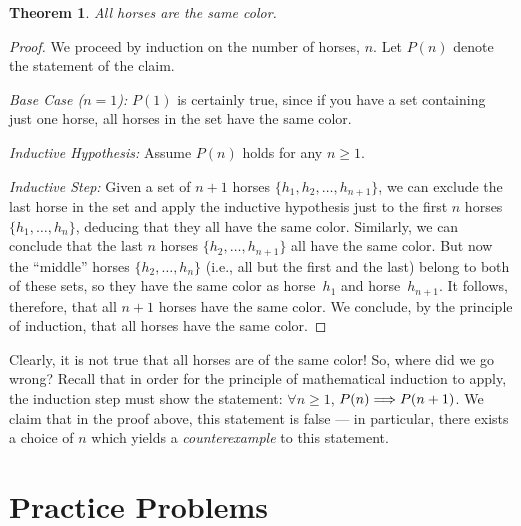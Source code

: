 \documentclass[11pt]{article}
\newcounter{thm}
\newtheorem{theorem}{Theorem}[thm]
\begin{document}
\begin{theorem} \label{thm:horses}
All horses are the same color.
\end{theorem}
\begin{proof}
We proceed by induction on the number of horses, $n$. Let $P(n)$ denote the statement of the claim.

\emph{Base Case ($n=1$):} $P(1)$ is certainly true, since if you have a set containing just
one horse, all horses in the set have the same color.

\emph{Inductive Hypothesis:} Assume $P(n)$ holds for any $n\geq 1$.

\emph{Inductive Step:} Given a set of $n+1$ horses $\{h_1,h_2,\ldots,h_{n+1}\}$,
we can exclude the last horse in the set and apply the inductive hypothesis
just to the first $n$ horses $\{h_1,\ldots,h_n\}$, deducing that they all have
the same color. Similarly, we can conclude that the last $n$ horses $\{h_2,\ldots,h_{n+1}\}$
all have the same color. But now the ``middle'' horses $\{h_2,\ldots,h_n\}$ (i.e., all
but the first and the last) belong to both of these sets, so they have the same
color as horse~$h_1$ and horse~$h_{n+1}$.  It follows, therefore, that all $n+1$ horses
have the same color. We conclude, by the principle of induction, that all horses have the same color.
\end{proof}

Clearly, it is not true that all horses are of the same color! So, where did we go wrong? Recall that in order for the principle of mathematical induction to apply, the induction step must show the statement: $\forall n\geq 1$, $P(n)\Longrightarrow P(n+1)$. We claim that in the proof above, this statement is false --- in particular, there exists a choice of $n$ which yields a \emph{counterexample} to this statement.



\section{Practice Problems}
\end{document}
